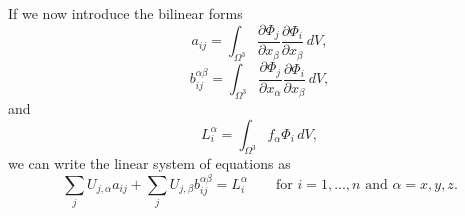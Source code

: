 \documentclass[oneside,a4paper,11pt]{report}
\begin{document}
If we now introduce the bilinear forms 
\begin{equation}
    a_{ij} = \int_{\Omega^3} \frac{\partial \Phi_j}{\partial x_\beta} \frac{\partial \Phi_i}{\partial x_\beta} \,dV,
\end{equation}
\begin{equation}
    b_{ij}^{\alpha \beta} = \int_{\Omega^3}\frac{\partial \Phi_j}{\partial x_\alpha} \frac{\partial \Phi_i}{\partial x_\beta} \, dV,
\end{equation}
and
\begin{equation}
    L_i^\alpha = \int_{\Omega^3} f_\alpha \Phi_i \,dV,
\end{equation}
we can write the linear system of equations as
\begin{equation}
    \sum_j U_{j,\alpha} a_{ij} + \sum_j U_{j,\beta} b_{ij}^{\alpha \beta} = L_i^\alpha \qquad \text{for } i = 1,...,n \text{ and } \alpha = x,y,z.
\end{equation}

\end{document}
